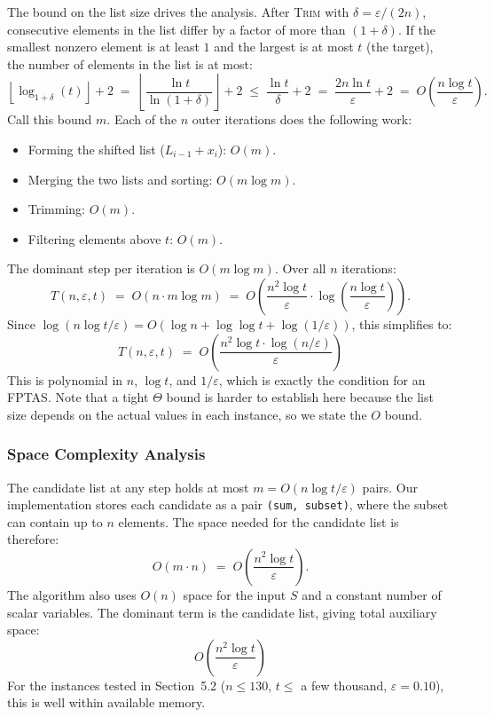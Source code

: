 \documentclass[12pt,a4paper]{article}
\theoremstyle{definition}
\begin{document}
The bound on the list size drives the analysis. After \textsc{Trim} with
$\delta = \varepsilon/(2n)$, consecutive elements in the list differ by a factor of
more than $(1+\delta)$. If the smallest nonzero element is at least $1$ and the
largest is at most $t$ (the target), the number of elements in the list is at most:
\[
  \left\lfloor \log_{1+\delta}(t) \right\rfloor + 2
  \;=\; \left\lfloor \frac{\ln t}{\ln(1+\delta)} \right\rfloor + 2
  \;\leq\; \frac{\ln t}{\delta} + 2
  \;=\; \frac{2n\ln t}{\varepsilon} + 2
  \;=\; O\!\left(\frac{n \log t}{\varepsilon}\right).
\]
Call this bound $m$. Each of the $n$ outer iterations does the following work:
\begin{itemize}[noitemsep]
  \item Forming the shifted list ($L_{i-1} + x_i$): $O(m)$.
  \item Merging the two lists and sorting: $O(m \log m)$.
  \item Trimming: $O(m)$.
  \item Filtering elements above $t$: $O(m)$.
\end{itemize}
The dominant step per iteration is $O(m \log m)$. Over all $n$ iterations:
\[
  T(n,\varepsilon,t) \;=\; O\!\left(n \cdot m \log m\right)
  \;=\; O\!\left(\frac{n^2 \log t}{\varepsilon}
               \cdot \log\!\left(\frac{n \log t}{\varepsilon}\right)\right).
\]
Since $\log(n \log t / \varepsilon) = O(\log n + \log\log t + \log(1/\varepsilon))$,
this simplifies to:
\[
  \boxed{T(n,\varepsilon,t) \;=\; O\!\left(\frac{n^2 \log t \cdot \log(n/\varepsilon)}{\varepsilon}\right)}
\]
This is polynomial in $n$, $\log t$, and $1/\varepsilon$, which is exactly the condition
for an FPTAS. Note that a tight $\Theta$ bound is harder to establish here because the
list size depends on the actual values in each instance, so we state the $O$ bound.

\subsubsection{Space Complexity Analysis}

The candidate list at any step holds at most $m = O(n \log t / \varepsilon)$ pairs.
Our implementation stores each candidate as a pair \texttt{(sum, subset)}, where the
subset can contain up to $n$ elements. The space needed for the candidate list is
therefore:
\[
  O(m \cdot n) \;=\; O\!\left(\frac{n^2 \log t}{\varepsilon}\right).
\]
The algorithm also uses $O(n)$ space for the input $S$ and a constant number of
scalar variables. The dominant term is the candidate list, giving total auxiliary space:
\[
  \boxed{O\!\left(\frac{n^2 \log t}{\varepsilon}\right)}
\]
For the instances tested in Section~5.2 ($n \leq 130$, $t \leq$ a few thousand,
$\varepsilon = 0.10$), this is well within available memory.
\end{document}
